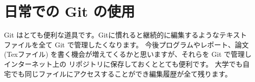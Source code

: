 \documentclass[a4paper,11pt, article]{memoir}
\begin{document}



\section*{日常での Git の使用}
Git はとても便利な道具です。Gitに慣れると継続的に編集するようなテキストファイルを全て Git で管理したくなります。
今後プログラムやレポート、論文(Texファイル) を書く機会が増えてくるかと思いますが、それらを Git で管理しインターネット上の
リポジトリに保存しておくととても便利です。
大学でも自宅でも同じファイルにアクセスすることができ編集履歴が全て残ります。
\end{document}
